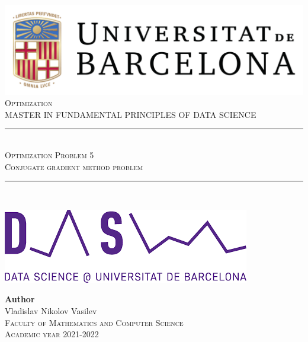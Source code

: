 \documentclass[11pt,a4paper]{article}
\newcommand{\subject}{Optimization}
\newcommand{\autor}{Vladislav Nikolov Vasilev}
\newcommand{\titulo}{Optimization Problem 5}
\newcommand{\subtitulo}{Conjugate gradient method problem}
\newcommand{\masters}{Master in Fundamental Principles of Data Science}
\begin{document}

\begin{titlepage}
  \begin{minipage}{\textwidth}
    \centering
    \includegraphics[scale=0.25]{img/ub-logo}\\[2cm]
    
    \textsc{\Large \subject\\[0.5cm]}
    \textsc{\uppercase\expandafter{\masters}}\\[1.5cm]
    
    \noindent\rule[-1ex]{\textwidth}{1pt}\\[1.5ex]
    \textsc{{\Huge \titulo\\[0.5ex]}}
    \textsc{{\Large \subtitulo\\}}
    \noindent\rule[-1ex]{\textwidth}{2pt}\\[3.5ex]
  \end{minipage}
  
  \vspace{2cm}
  
  \begin{minipage}{\textwidth}
    \centering
    
    \includegraphics[scale=0.4]{img/ub-ds-logo}
    \vspace{2cm}
    
    \textbf{Author}\\ {\autor{}}\\[2.5ex]
    \textsc{Faculty of Mathematics and Computer Science}\\
    \vspace{1em}
    \textsc{Academic year 2021-2022}
  \end{minipage}
\end{titlepage}
\end{document}

